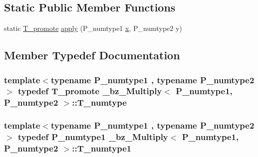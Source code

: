 \subsection*{Static Public Member Functions}
\begin{DoxyCompactItemize}
\item 
static \hyperlink{minmax_8h_aaa88a440c2f0d00798d5b1d42c79308d}{T\+\_\+promote} \hyperlink{class__bz__Multiply_a475aaaf6f136f9134e7521ed2979142e}{apply} (P\+\_\+numtype1 \hyperlink{vecnorm1_8cc_ac73eed9e41ec09d58f112f06c2d6cb63}{x}, P\+\_\+numtype2 y)
\end{DoxyCompactItemize}


\subsection{Member Typedef Documentation}
\hypertarget{class__bz__Multiply_a073d2c4aa1a34756dc04db37be793928}{}
\subsubsection[{T\+\_\+numtype}]{\setlength{\rightskip}{0pt plus 5cm}template$<$typename P\+\_\+numtype1 , typename P\+\_\+numtype2 $>$ typedef {\bf T\+\_\+promote} {\bf \+\_\+bz\+\_\+\+Multiply}$<$ P\+\_\+numtype1, P\+\_\+numtype2 $>$\+::{\bf T\+\_\+numtype}}\label{class__bz__Multiply_a073d2c4aa1a34756dc04db37be793928}
\hypertarget{class__bz__Multiply_a5db2c816998dace3c8fbbbc273ffbb7c}{}
\subsubsection[{T\+\_\+numtype1}]{\setlength{\rightskip}{0pt plus 5cm}template$<$typename P\+\_\+numtype1 , typename P\+\_\+numtype2 $>$ typedef P\+\_\+numtype1 {\bf \+\_\+bz\+\_\+\+Multiply}$<$ P\+\_\+numtype1, P\+\_\+numtype2 $>$\+::{\bf T\+\_\+numtype1}}\label{class__bz__Multiply_a5db2c816998dace3c8fbbbc273ffbb7c}
\hypertarget{class__bz__Multiply_ac3ca14bee71464d93b6681b7d8ac6a33}{}
